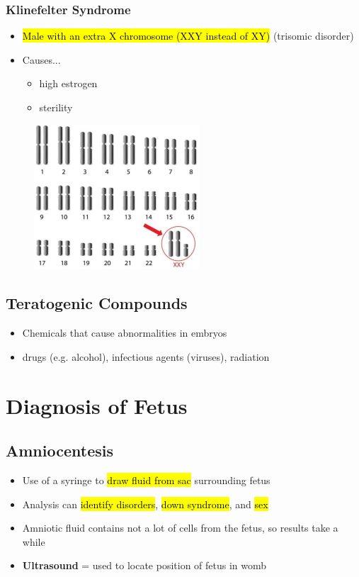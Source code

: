 \documentclass[a4paper,12pt]{article}
\begin{document}
\subsubsection{Klinefelter Syndrome}
\begin{itemize}
    \item{\hl{Male with an extra \female X chromosome (XXY instead of XY)} (trisomic disorder)}
    \item{
            Causes...
            \begin{itemize}
                \item{high estrogen}
                \item{sterility}
            \end{itemize}
        }
\end{itemize}

\begin{figure}[H]
    \centering
    \includegraphics[width=0.55\textwidth]{klinefelter}
\end{figure}

\subsection{Teratogenic Compounds}
\begin{itemize}
    \item{Chemicals that cause abnormalities in embryos}
    \item{drugs (e.g. alcohol), infectious agents (viruses), radiation}
\end{itemize}

\section{Diagnosis of Fetus}

\subsection{Amniocentesis}
\begin{itemize}
    \item{Use of a syringe to \hl{draw fluid from sac} surrounding fetus}
    \item{Analysis can \hl{identify disorders}, \hl{down syndrome}, and \hl{sex}}
    \item{Amniotic fluid contains not a lot of cells from the fetus, so results take a while}
    \item{\textbf{Ultrasound} = used to locate position of fetus in womb}
\end{itemize}
\end{document}
